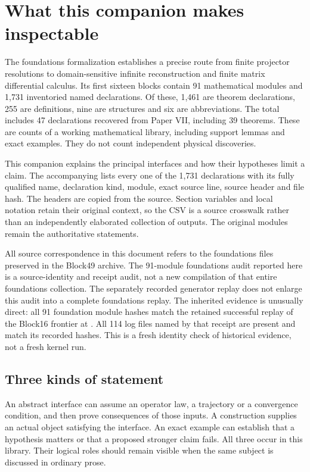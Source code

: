 \section{What this companion makes inspectable}

The foundations formalization establishes a precise route from finite projector resolutions to domain-sensitive infinite reconstruction and finite matrix differential calculus. Its first sixteen blocks contain 91 mathematical modules and 1,731 inventoried named declarations. Of these, 1,461 are theorem declarations, 255 are definitions, nine are structures and six are abbreviations. The total includes 47 declarations recovered from Paper VII, including 39 theorems. These are counts of a working mathematical library, including support lemmas and exact examples. They do not count independent physical discoveries.

This companion explains the principal interfaces and how their hypotheses limit a claim. The accompanying  lists every one of the 1,731 declarations with its fully qualified name, declaration kind, module, exact source line, source header and file hash. The headers are copied from the source. Section variables and local notation retain their original context, so the CSV is a source crosswalk rather than an independently elaborated collection of  outputs. The original modules remain the authoritative statements.

All source correspondence in this document refers to the foundations files preserved in the Block49 archive. The 91-module foundations audit reported here is a source-identity and receipt audit, not a new compilation of that entire foundations collection. The separately recorded generator replay does not enlarge this audit into a complete foundations replay. The inherited evidence is unusually direct: all 91 foundation module hashes match the retained successful replay of the Block16 frontier at . All 114 log files named by that receipt are present and match its recorded hashes. This is a fresh identity check of historical evidence, not a fresh kernel run.

\subsection{Three kinds of statement}

An abstract interface can assume an operator law, a trajectory or a convergence condition, and then prove consequences of those inputs. A construction supplies an actual object satisfying the interface. An exact example can establish that a hypothesis matters or that a proposed stronger claim fails. All three occur in this library. Their logical roles should remain visible when the same subject is discussed in ordinary prose.

